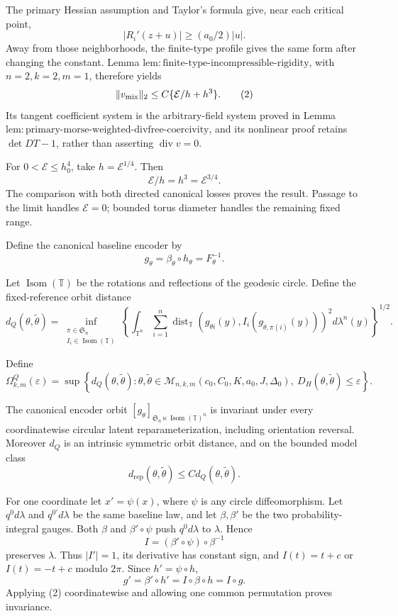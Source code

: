 The primary Hessian assumption and Taylor's formula give, near each critical point,
\[
 |R_i'(z+u)|\geq(a_0/2)|u|.
\tag{1}
\]
Away from those neighborhoods, the finite-type profile gives the same form after changing the constant.  Lemma \(\mathrm{lem:finite\text{-}type\text{-}incompressible\text{-}rigidity}\), with \(n=2,k=2,m=1\), therefore yields
\[
 \lVert v_{\rm mix}\rVert_2\leq C\{\mathcal E/h+h^3\}.
\tag{2}
\]
Its tangent coefficient system is the arbitrary-field system proved in Lemma \(\mathrm{lem:primary\text{-}morse\text{-}weighted\text{-}divfree\text{-}coercivity}\), and its nonlinear proof retains \(\det DT-1\), rather than asserting \(\operatorname {div}v=0\).

For \(0<\mathcal E\leq h_0^4\), take \(h=\mathcal E^{1/4}\).  Then
\[
 \mathcal E/h=h^3=\mathcal E^{3/4}.
\tag{3}
\]
The comparison with both directed canonical losses proves the result.  Passage to the limit handles \(\mathcal E=0\); bounded torus diameter handles the remaining fixed range.

Define the canonical baseline encoder by
\[
 g_\theta=\beta_\theta\circ h_\theta=F_\theta^{-1}.
\]

Let \(\operatorname {Isom}(\mathbb T)\) be the rotations and reflections of the geodesic circle.  Define the fixed-reference orbit distance
\[
 d_Q(\theta,\widetilde\theta)=
 \inf_{\substack{\pi\in\mathfrak S_n\\ I_i\in\operatorname {Isom}(\mathbb T)}}
 \left\{\int_{\mathbb T^n}\sum_{i=1}^n
 \operatorname {dist}_{\mathbb T}\!\left(
 g_{\theta i}(y),I_i\!\left(g_{\widetilde\theta,\pi(i)}(y)\right)
 \right)^2d\lambda^n(y)\right\}^{1/2}.
\]

Define
\[
 \Omega^Q_{k,m}(\varepsilon)=
 \sup\left\{d_Q(\theta,\widetilde\theta):
 \theta,\widetilde\theta\in\mathcal M_{n,k,m}(c_0,C_0,K,a_0,J,\Delta_0),\
 D_H(\theta,\widetilde\theta)\leq\varepsilon\right\}.
\]

The canonical encoder orbit \([g_\theta]_{\mathfrak S_n\ltimes\operatorname {Isom}(\mathbb T)^n}\) is invariant under every coordinatewise circular latent reparameterization, including orientation reversal.  Moreover \(d_Q\) is an intrinsic symmetric orbit distance, and on the bounded model class
\[
 d_{\mathrm{rep}}(\theta,\widetilde\theta)\leq C d_Q(\theta,\widetilde\theta).
\]

For one coordinate let \(x'=\psi(x)\), where \(\psi\) is any circle diffeomorphism.  Let \(q^0d\lambda\) and \(q^{0\prime}d\lambda\) be the same baseline law, and let \(\beta,\beta'\) be the two probability-integral gauges.  Both \(\beta\) and \(\beta'\circ\psi\) push \(q^0d\lambda\) to \(\lambda\).  Hence
\[
 I=(\beta'\circ\psi)\circ\beta^{-1}
\tag{1}
\]
preserves \(\lambda\).  Thus \(|I'|=1\), its derivative has constant sign, and \(I(t)=t+c\) or \(I(t)=-t+c\) modulo \(2\pi\).  Since \(h'=\psi\circ h\),
\[
 g'=\beta'\circ h'=I\circ\beta\circ h=I\circ g.
\tag{2}
\]
Applying (2) coordinatewise and allowing one common permutation proves invariance.

